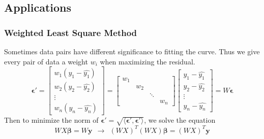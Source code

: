 \documentclass[11pt]{article}
\begin{document}
\subsection{Applications}
\subsubsection{Weighted Least Square Method}
Sometimes data pairs have different significance to fitting the curve. Thus we give every pair of data a weight $w_i$ when maximizing the residual.
\begin{equation}
    \bm{\epsilon}' = \begin{bmatrix}
    w_1(y_1 - \hat{y_1}) \\ w_2(y_2 - \hat{y_2}) \\ \vdots \\ w_n(y_n - \hat{y_n}) 
    \end{bmatrix} = \begin{bmatrix}
    w_1 & & & \\
    & w_2 & & \\
    & & \ddots & \\
    & & & w_n 
    \end{bmatrix} \begin{bmatrix}
    y_1 - \hat{y_1} \\ y_2 - \hat{y_2} \\ \vdots \\ y_n - \hat{y_n}
    \end{bmatrix} = W\bm{\epsilon}
\end{equation}
Then to minimize the norm of $\bm{\epsilon}' = \sqrt{\langle \bm{\epsilon}',\bm{\epsilon}'\rangle}$, we solve the equation
\begin{equation}
    WX\bm{\beta} = W\bm{y}~~\rightarrow~~(WX)^T(WX)\bm{\beta} = (WX)^T \bm{y}
\end{equation}
\end{document}

